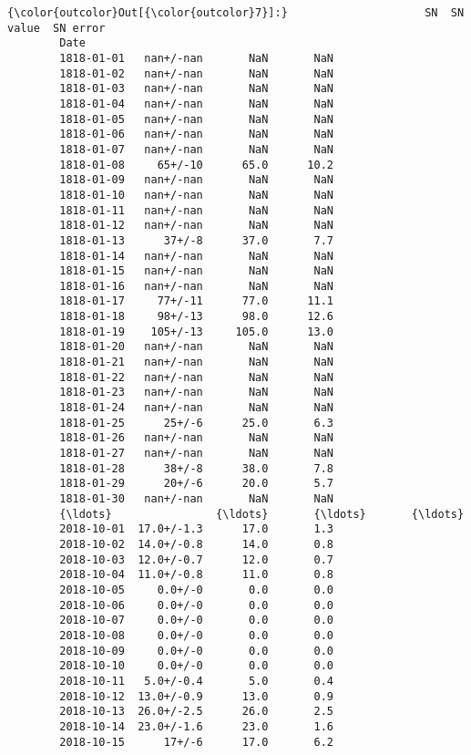 \documentclass[11pt]{article}
\begin{document}
\begin{Verbatim}[commandchars=\\\{\}]
{\color{outcolor}Out[{\color{outcolor}7}]:}                     SN  SN value  SN error
        Date                                      
        1818-01-01   nan+/-nan       NaN       NaN
        1818-01-02   nan+/-nan       NaN       NaN
        1818-01-03   nan+/-nan       NaN       NaN
        1818-01-04   nan+/-nan       NaN       NaN
        1818-01-05   nan+/-nan       NaN       NaN
        1818-01-06   nan+/-nan       NaN       NaN
        1818-01-07   nan+/-nan       NaN       NaN
        1818-01-08     65+/-10      65.0      10.2
        1818-01-09   nan+/-nan       NaN       NaN
        1818-01-10   nan+/-nan       NaN       NaN
        1818-01-11   nan+/-nan       NaN       NaN
        1818-01-12   nan+/-nan       NaN       NaN
        1818-01-13      37+/-8      37.0       7.7
        1818-01-14   nan+/-nan       NaN       NaN
        1818-01-15   nan+/-nan       NaN       NaN
        1818-01-16   nan+/-nan       NaN       NaN
        1818-01-17     77+/-11      77.0      11.1
        1818-01-18     98+/-13      98.0      12.6
        1818-01-19    105+/-13     105.0      13.0
        1818-01-20   nan+/-nan       NaN       NaN
        1818-01-21   nan+/-nan       NaN       NaN
        1818-01-22   nan+/-nan       NaN       NaN
        1818-01-23   nan+/-nan       NaN       NaN
        1818-01-24   nan+/-nan       NaN       NaN
        1818-01-25      25+/-6      25.0       6.3
        1818-01-26   nan+/-nan       NaN       NaN
        1818-01-27   nan+/-nan       NaN       NaN
        1818-01-28      38+/-8      38.0       7.8
        1818-01-29      20+/-6      20.0       5.7
        1818-01-30   nan+/-nan       NaN       NaN
        {\ldots}                {\ldots}       {\ldots}       {\ldots}
        2018-10-01  17.0+/-1.3      17.0       1.3
        2018-10-02  14.0+/-0.8      14.0       0.8
        2018-10-03  12.0+/-0.7      12.0       0.7
        2018-10-04  11.0+/-0.8      11.0       0.8
        2018-10-05     0.0+/-0       0.0       0.0
        2018-10-06     0.0+/-0       0.0       0.0
        2018-10-07     0.0+/-0       0.0       0.0
        2018-10-08     0.0+/-0       0.0       0.0
        2018-10-09     0.0+/-0       0.0       0.0
        2018-10-10     0.0+/-0       0.0       0.0
        2018-10-11   5.0+/-0.4       5.0       0.4
        2018-10-12  13.0+/-0.9      13.0       0.9
        2018-10-13  26.0+/-2.5      26.0       2.5
        2018-10-14  23.0+/-1.6      23.0       1.6
        2018-10-15      17+/-6      17.0       6.2

\end{Verbatim}
\end{document}
